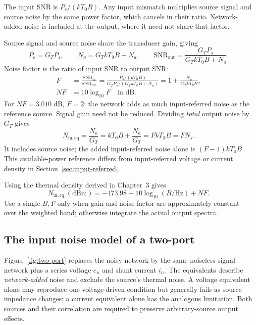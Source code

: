 The input SNR is $P_s/(kT_0B)$. Any input mismatch multiplies source signal and source noise by the same power factor, which cancels in their ratio. Network-added noise is included at the output, where it need not share that factor.

Source signal and source noise share the transducer gain, giving
\[
P_o=G_TP_s,\qquad N_o=G_TkT_0B+N_a,\qquad
\mathrm{SNR}_{\mathrm{out}}=\frac{G_TP_s}{G_TkT_0B+N_a}.
\]
Noise factor is the ratio of input SNR to output SNR:
\begin{align}
F&=\frac{\mathrm{SNR}_{\mathrm{in}}}{\mathrm{SNR}_{\mathrm{out}}}
=\frac{P_s/(kT_0B)}{G_TP_s/(G_TkT_0B+N_a)}
=1+\frac{N_a}{G_TkT_0B},\\
NF&=10\log_{10}F\quad\text{in dB}.
\end{align}
For $NF=3.010$ dB, $F=2$: the network adds as much input-referred noise as the reference source. Signal gain need not be reduced. Dividing \emph{total} output noise by $G_T$ gives
\begin{equation}
\boxed{N_{\mathrm{in,eq}}=\frac{N_o}{G_T}
=kT_0B+\frac{N_a}{G_T}=FkT_0B=FN_s.}
\label{eq:input-referred-power}
\end{equation}
It includes source noise; the added input-referred noise alone is $(F-1)kT_0B$. This available-power reference differs from input-referred voltage or current density in Section~\ref{sec:input-referred}.

Using the thermal density derived in Chapter~3 gives
\begin{equation}
\boxed{N_{\mathrm{in,eq}}\ (\mathrm{dBm})
=-173.98+10\log_{10}(B/\mathrm{Hz})+NF.}
\label{eq:opening}
\end{equation}
Use a single $B,F$ only when gain and noise factor are approximately constant over the weighted band; otherwise integrate the actual output spectra.

\subsection{The input noise model of a two-port}
\label{sec:twoport}
Figure~\ref{fig:two-port} replaces the noisy network by the same noiseless signal network plus a series voltage $e_n$ and shunt current $i_n$. The equivalents describe \emph{network-added} noise and exclude the source's thermal noise. A voltage equivalent alone may reproduce one voltage-driven condition but generally fails as source impedance changes; a current equivalent alone has the analogous limitation. Both sources and their correlation are required to preserve arbitrary-source output effects.

